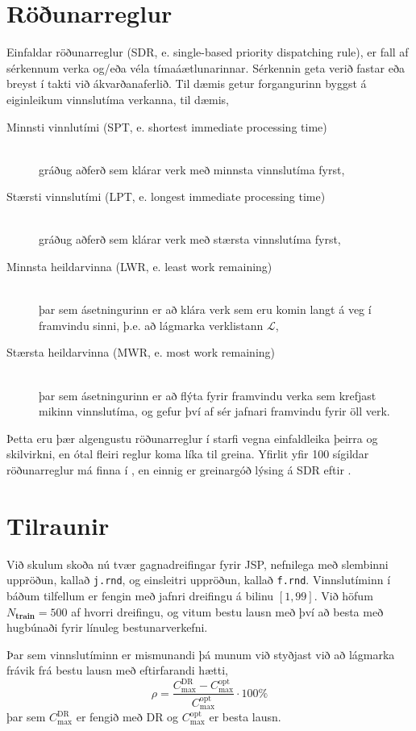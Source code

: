 \documentclass[10pt,a4paper]{article}
\begin{document}
\section*{Röðunarreglur}
Einfaldar röðunarreglur (SDR, e. single-based priority dispatching rule), er 
fall af sérkennum verka og/eða véla tímaáætlunarinnar. Sérkennin geta verið 
fastar eða breyst í takti við ákvarðanaferlið. Til dæmis getur forgangurinn 
byggst á eiginleikum vinnslutíma verkanna, til dæmis, 
\begin{description}
    \item[Minnsti vinnlutími (SPT, e. shortest immediate processing time)] 
    \hfill \\ gráðug aðferð sem klárar verk með minnsta vinnslutíma fyrst, 
    \item[Stærsti vinnslutími (LPT, e. longest immediate processing time)] 
    \hfill \\ gráðug aðferð sem klárar verk með stærsta vinnslutíma fyrst, 
    \item[Minnsta heildarvinna (LWR, e. least work remaining)] \hfill \\
    þar sem ásetningurinn er að klára verk sem eru komin langt á veg í 
    framvindu sinni, þ.e. að lágmarka verklistann $\mathcal{L}$,
    \item[Stærsta heildarvinna (MWR, e. most work remaining)] \hfill \\
    þar sem ásetningurinn er að flýta fyrir framvindu verka sem krefjast mikinn 
    vinnslutíma, og gefur því af sér jafnari framvindu fyrir öll verk.
\end{description}
Þetta eru þær algengustu röðunarreglur í starfi vegna einfaldleika þeirra og 
skilvirkni, en ótal fleiri reglur koma líka til greina. Yfirlit yfir 100 
sígildar röðunarreglur má finna í \citet{Panwalkar77}, en einnig er greinargóð 
lýsing á SDR eftir \citet{Haupt89}. 

\section*{Tilraunir}
Við skulum skoða nú tvær gagnadreifingar fyrir JSP, nefnilega með slembinni 
uppröðun, kallað \texttt{j.rnd}, og einsleitri uppröðun, kallað \texttt{f.rnd}. 
Vinnslutíminn í báðum tilfellum er fengin með jafnri dreifingu á bilinu 
$[1,99]$.
Við höfum $N_{\textbf{train}}=500$ af hvorri dreifingu, og vitum bestu lausn 
með því að besta með hugbúnaði fyrir línuleg bestunarverkefni. 

Þar sem vinnslutíminn er mismunandi þá munum við styðjast við að lágmarka 
frávik frá bestu lausn með eftirfarandi hætti, 
\begin{equation}
\rho=\frac{C_{\max}^{\text{DR}}-C_{\max}^{\text{opt}}}{C_{\max}^{\text{opt}}}
\cdot 100\%
\end{equation}
þar sem $C_{\max}^{\text{DR}}$ er fengið með DR og $C_{\max}^{\text{opt}}$ er 
besta lausn. 
\end{document}
